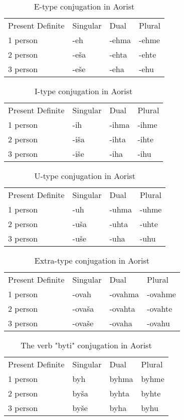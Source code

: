 \begin{table}[!htb]
	\caption{E-type conjugation in Aorist}
	\begin{tabular}{llll}
		Present Definite & Singular & Dual & Plural \\
		1 person & -eh & -ehma & -ehme \\
		2 person & -eša & -ehta & -ehte \\
		3 person & -eše & -eha & -ehu
	\end{tabular}
\end{table}

\begin{table}[!htb]
	\caption{I-type conjugation in Aorist}
	\begin{tabular}{llll}
		Present Definite & Singular & Dual & Plural \\
		1 person & -ih & -ihma & -ihme \\
		2 person & -iša & -ihta & -ihte \\
		3 person & -iše & -iha & -ihu
	\end{tabular}
\end{table}

\begin{table}[!htb]
	\caption{U-type conjugation in Aorist}
	\begin{tabular}{llll}
		Present Definite & Singular & Dual & Plural \\
		1 person & -uh & -uhma & -uhme \\
		2 person & -uša & -uhta & -uhte \\
		3 person & -uše & -uha & -uhu
	\end{tabular}
\end{table}

\begin{table}[!htb]
	\caption{Extra-type conjugation in Aorist}
	\begin{tabular}{llll}
		Present Definite & Singular & Dual & Plural \\
		1 person & -ovah & -ovahma & -ovahme \\
		2 person & -ovaša & -ovahta & -ovahte \\
		3 person & -ovaše & -ovaha & -ovahu
	\end{tabular}
\end{table}

\begin{table}[!htb]
	\caption{The verb "byti" conjugation in Aorist}
	\begin{tabular}{llll}
		Present Definite & Singular & Dual & Plural \\
		1 person & byh & byhma & byhme \\
		2 person & byša & byhta & byhte \\
		3 person & byše & byha & byhu 
	\end{tabular}
\end{table}

